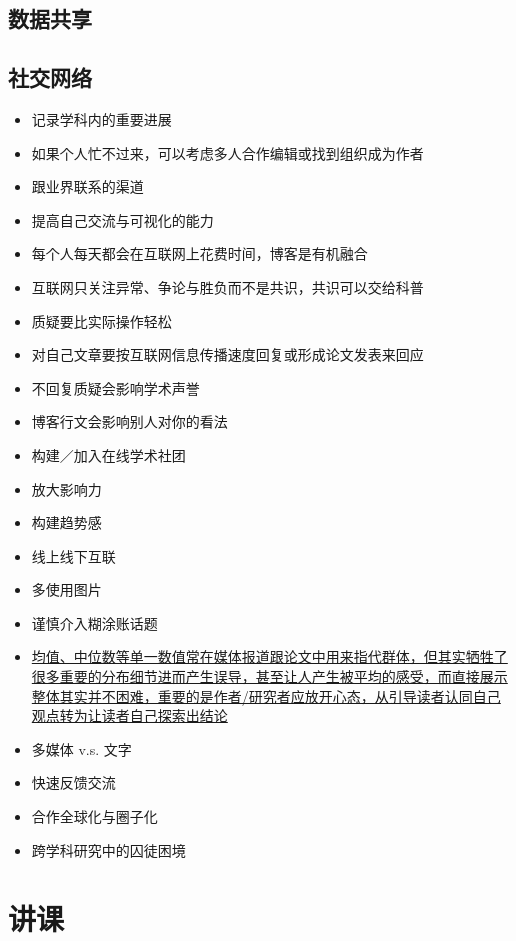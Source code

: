 \documentclass[]{tufte-book}
\providecommand{\tightlist}{%
  \setlength{\itemsep}{0pt}\setlength{\parskip}{0pt}}
\begin{document}
\hypertarget{ux6570ux636eux5171ux4eab}{%
\subsection{数据共享}\label{ux6570ux636eux5171ux4eab}}

\hypertarget{ux793eux4ea4ux7f51ux7edc}{%
\subsection{社交网络}\label{ux793eux4ea4ux7f51ux7edc}}

\begin{itemize}
\tightlist
\item
  记录学科内的重要进展
\item
  如果个人忙不过来，可以考虑多人合作编辑或找到组织成为作者
\item
  跟业界联系的渠道
\item
  提高自己交流与可视化的能力
\item
  每个人每天都会在互联网上花费时间，博客是有机融合
\item
  互联网只关注异常、争论与胜负而不是共识，共识可以交给科普
\item
  质疑要比实际操作轻松
\item
  对自己文章要按互联网信息传播速度回复或形成论文发表来回应
\item
  不回复质疑会影响学术声誉
\item
  博客行文会影响别人对你的看法
\item
  构建／加入在线学术社团
\item
  放大影响力
\item
  构建趋势感
\item
  线上线下互联
\item
  多使用图片
\item
  谨慎介入糊涂账话题
\item
  \href{http://flowingdata.com/2017/07/07/small-summary-stats/}{均值、中位数等单一数值常在媒体报道跟论文中用来指代群体，但其实牺牲了很多重要的分布细节进而产生误导，甚至让人产生被平均的感受，而直接展示整体其实并不困难，重要的是作者/研究者应放开心态，从引导读者认同自己观点转为让读者自己探索出结论}
\item
  多媒体 v.s. 文字
\item
  快速反馈交流
\item
  合作全球化与圈子化
\item
  跨学科研究中的囚徒困境
\end{itemize}

\hypertarget{ux8bb2ux8bfe}{%
\section{讲课}\label{ux8bb2ux8bfe}}
\end{document}
